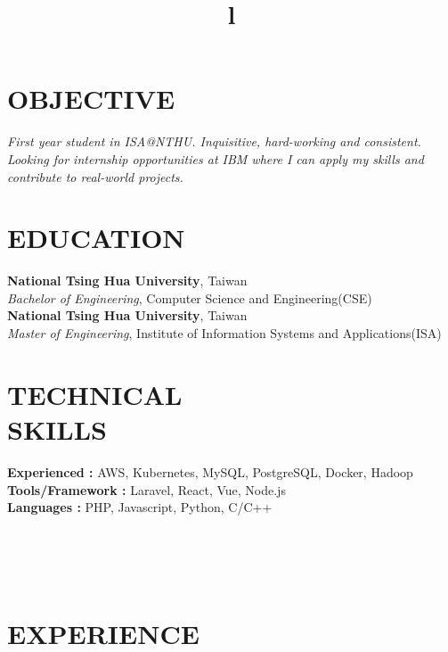 \documentclass[margin]{res}
\begin{document}
\begin{resume}
\section{OBJECTIVE}
{\sl First year student in ISA@NTHU. Inquisitive, hard-working and consistent. Looking for internship opportunities at IBM where I can apply my skills and contribute to real-world projects. }

\section{EDUCATION}
\textbf{National Tsing Hua University}, Taiwan\\
{\sl Bachelor of Engineering}, Computer Science and Engineering(CSE)\\
\textbf{National Tsing Hua University}, Taiwan \\
{\sl Master of Engineering}, Institute of Information Systems and Applications(ISA) 
\section{TECHNICAL\\SKILLS}

\textbf{Experienced : } AWS, Kubernetes, MySQL, PostgreSQL, Docker, Hadoop
\\
\textbf{Tools/Framework : } Laravel, React, Vue, Node.js
\\
\textbf{Languages : } PHP, Javascript, Python, C/C++

\begin{format}
\title{l}\\
\\
\body\\
\end{format}

\section{EXPERIENCE}


\end{resume}
\end{document}

